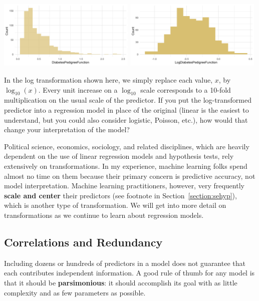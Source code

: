 \begin{center}
\includegraphics[width=0.49\textwidth]{img/pima-diab-ped-function.png} \includegraphics[width=0.49\textwidth]{img/pima-diab-ped-function-log.png}
\end{center}

\begin{question}{}
In the log transformation shown here, we simply replace each value, $x$, by $\log_{10}(x)$. Every unit increase on a $\log_{10}$ scale corresponds to a 10-fold multiplication on the usual scale of the predictor. If you put the log-transformed predictor into a regression model in place of the original (linear is the easiest to understand, but you could also consider logistic, Poisson, etc.), how would that change your interpretation of the model? 
\end{question}

Political science, economics, sociology, and related disciplines, which are heavily dependent on the use of linear regression models and hypothesis tests, rely extensively on transformations. In my experience, machine learning folks spend almost no time on them because their primary concern is predictive accuracy, not model interpretation. Machine learning practitioners, however, very frequently \textbf{scale and center} their predictors (see footnote in Section~\ref{section:sehyp}), which is another type of transformation. We will get into more detail on transformations as we continue to learn about regression models. 

\subsection{Correlations and Redundancy \label{section:redund}}

Including dozens or hundreds of predictors in a model does not guarantee that each contributes independent information. A good rule of thumb for any model is that it should be \textbf{parsimonious}: it should accomplish its goal with as little complexity and as few parameters as possible.

